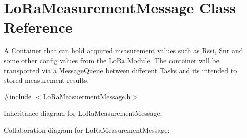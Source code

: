 \hypertarget{class_lo_ra_measurement_message}{}\section{Lo\+Ra\+Measurement\+Message Class Reference}
\label{class_lo_ra_measurement_message}


A Container that can hold acquired measurement values such as Rssi, Snr and some other config values from the \hyperlink{class_lo_ra}{Lo\+Ra} Module. The container will be transported via a Message\+Queue between different Tasks and its intended to stored measurement results.  




{\ttfamily \#include $<$Lo\+Ra\+Measuerment\+Message.\+h$>$}



Inheritance diagram for Lo\+Ra\+Measurement\+Message\+:


Collaboration diagram for Lo\+Ra\+Measurement\+Message\+:
